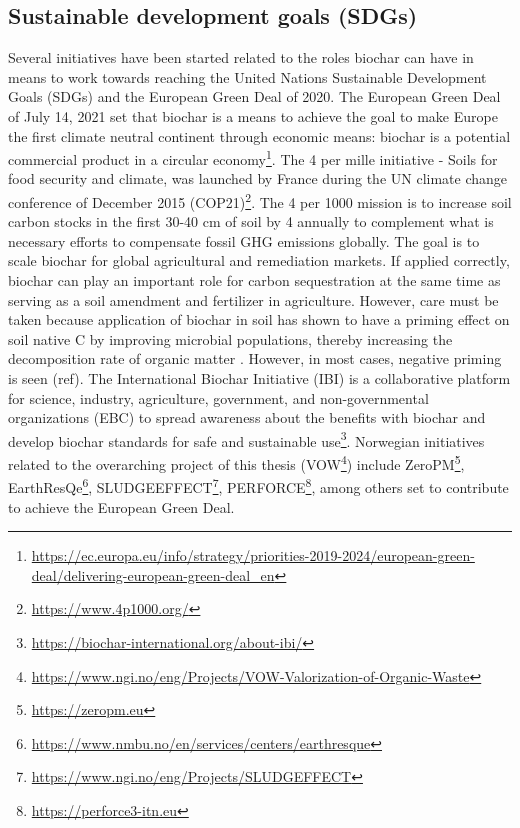 
\subsection{Sustainable development goals (SDGs) \label{sec:SDGs}}
Several initiatives have been started related to the roles biochar can have in means to work towards reaching the United Nations Sustainable Development Goals (\acrshort{SDGs}) \citep{SDGs2015} and the European Green Deal of 2020. The European Green Deal of July 14, 2021 set that biochar is a means to achieve the goal to make Europe the first climate neutral continent through economic means: biochar is a potential commercial product in a circular economy\footnote{\url{https://ec.europa.eu/info/strategy/priorities-2019-2024/european-green-deal/delivering-european-green-deal_en}}. The 4 per mille initiative - Soils for food security and climate, was launched by France during the UN climate change conference of December 2015 (COP21)\footnote{\url{https://www.4p1000.org/}}. The 4 per 1000 mission is to increase soil carbon stocks in the first 30-40 cm of soil by 4 \textperthousand  annually to complement what is necessary efforts to compensate fossil GHG emissions globally. The goal is to scale biochar for global agricultural and remediation markets. If applied correctly, biochar can play an important role for carbon sequestration at the same time as serving as a soil amendment and fertilizer in agriculture. However, care must be taken because application of biochar in soil has shown to have a priming effect on soil native C by improving microbial populations, thereby increasing the decomposition rate of organic matter \citep{Ahmad2014}. However, in most cases, negative priming is seen (ref). The International Biochar Initiative (IBI) is a collaborative platform for science, industry, agriculture, government, and non-governmental organizations (EBC) to spread awareness about the benefits with biochar and develop biochar standards for safe and sustainable use\footnote{\url{https://biochar-international.org/about-ibi/}}. Norwegian initiatives related to the overarching project of this thesis (VOW\footnote{\url{https://www.ngi.no/eng/Projects/VOW-Valorization-of-Organic-Waste}}) include ZeroPM\footnote{\url{https://zeropm.eu}}, EarthResQe\footnote{\url{https://www.nmbu.no/en/services/centers/earthresque}}, SLUDGEEFFECT\footnote{\url{https://www.ngi.no/eng/Projects/SLUDGEFFECT}}, PERFORCE\footnote{\url{https://perforce3-itn.eu}}, among others set to contribute to achieve the European Green Deal. 

